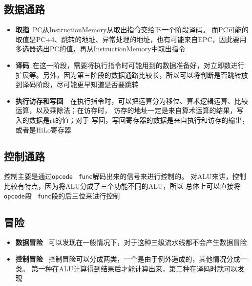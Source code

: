 \documentclass[UTF8]{ctexart}
\begin{document}
\subsection{数据通路}
\begin{itemize}
    \item{\textbf{取指}\   PC从InstructionMemory从取出指令交给下一个阶段译码。
    而PC可能的取值是PC+4、跳转的地址、异常处理的地址，也有可能来自EPC，因此要用多选器选出PC的值，再从InstructionMemory中取出指令}
    \item{\textbf{译码}\  在这一阶段，需要将执行指令时可能用到的数据准备好，对立即数进行扩展等。另外，因为第三阶段的数据通路比较长，所以可以将判断是否跳转放到译码阶段，尽可能更早知道是否要跳转}
    \item{\textbf{执行访存和写回}\ \  在执行指令时，可以把运算分为移位、算术逻辑运算、比较运算，以及乘除法；在访存时，
    访存的地址一定是来自算术运算的结果，写入的数据是rt的值；对于
    写回，写回寄存器的数据是来自执行和访存的输出，或者是HiLo寄存器}
\end{itemize}
\subsection{控制通路}
控制主要是通过\texttt{opcode} \ \texttt{func}解码出来的信号来进行控制的。
对ALU来讲，控制比较有特点，因为将ALU分成了三个功能不同的ALU，所以
总体上可以直接将\texttt{opcode}段 \ \texttt{func}段的后三位来进行控制

\subsection{冒险}
\begin{itemize}
    \item{\textbf{数据冒险} \ 可以发现在一般情况下，对于这种三级流水线都不会产生数据冒险}
    \item {\textbf{控制冒险} \ 控制冒险可以分成两类，一个是由于例外造成的，其他情况分成一类。
    第一种在ALU计算得到结果后才能计算出来，第二种在译码时就可以发现}
\end{itemize}
\end{document}
